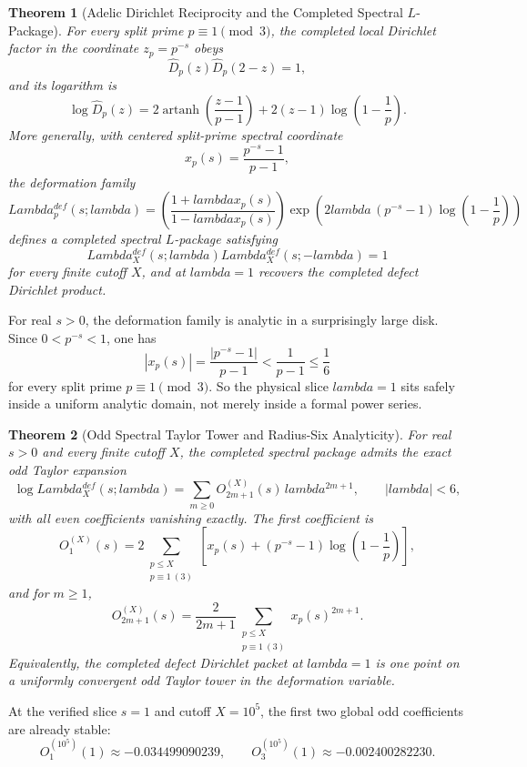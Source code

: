 \documentclass[12pt,a4paper]{article}
\def\mathrm#1{#1}%
\def\mathcal#1{#1}%
\def\lambda{lambda}%
\def\Lambda{Lambda}%
\newtheorem{theorem}{Theorem}[section]
\theoremstyle{definition}
\begin{document}
\begin{theorem}[Adelic Dirichlet Reciprocity and the Completed Spectral $L$-Package]
For every split prime $p\equiv1\pmod3$, the completed local Dirichlet factor in the coordinate $z_p=p^{-s}$ obeys
\[
\widehat D_p(z)\widehat D_p(2-z)=1,
\]
and its logarithm is
\[
\log \widehat D_p(z)
=
2\operatorname{artanh}\!\left(\frac{z-1}{p-1}\right)
+2(z-1)\log\!\left(1-\frac1p\right).
\]
More generally, with centered split-prime spectral coordinate
\[
x_p(s)=\frac{p^{-s}-1}{p-1},
\]
the deformation family
\[
\Lambda_p^{\mathrm{def}}(s;\lambda)
=
\left(\frac{1+\lambda x_p(s)}{1-\lambda x_p(s)}\right)
\exp\!\left(2\lambda\,(p^{-s}-1)\log\!\left(1-\frac1p\right)\right)
\]
defines a completed spectral $L$-package satisfying
\[
\Lambda_X^{\mathrm{def}}(s;\lambda)\Lambda_X^{\mathrm{def}}(s;-\lambda)=1
\]
for every finite cutoff $X$, and at $\lambda=1$ recovers the completed defect Dirichlet product.
\end{theorem}

For real $s>0$, the deformation family is analytic in a surprisingly large disk. Since $0<p^{-s}<1$, one has
\[
|x_p(s)|=\frac{|p^{-s}-1|}{p-1}<\frac{1}{p-1}\le\frac16
\]
for every split prime $p\equiv1\pmod3$. So the physical slice $\lambda=1$ sits safely inside a uniform analytic domain, not merely inside a formal power series.

\begin{theorem}[Odd Spectral Taylor Tower and Radius-Six Analyticity]
For real $s>0$ and every finite cutoff $X$, the completed spectral package admits the exact odd Taylor expansion
\[
\log \Lambda_X^{\mathrm{def}}(s;\lambda)
=
\sum_{m\ge0}\mathcal O_{2m+1}^{(X)}(s)\,\lambda^{2m+1},
\qquad |\lambda|<6,
\]
with all even coefficients vanishing exactly. The first coefficient is
\[
\mathcal O_1^{(X)}(s)
=
2\sum_{\substack{p\le X\\ p\equiv1\ (3)}}
\left[
x_p(s)+(p^{-s}-1)\log\!\left(1-\frac1p\right)
\right],
\]
and for $m\ge1$,
\[
\mathcal O_{2m+1}^{(X)}(s)
=
\frac{2}{2m+1}
\sum_{\substack{p\le X\\ p\equiv1\ (3)}} x_p(s)^{2m+1}.
\]
Equivalently, the completed defect Dirichlet packet at $\lambda=1$ is one point on a uniformly convergent odd Taylor tower in the deformation variable.
\end{theorem}

At the verified slice $s=1$ and cutoff $X=10^5$, the first two global odd coefficients are already stable:
\[
\mathcal O_1^{(10^5)}(1)\approx -0.034499090239,
\qquad
\mathcal O_3^{(10^5)}(1)\approx -0.002400282230.
\]
\end{document}
